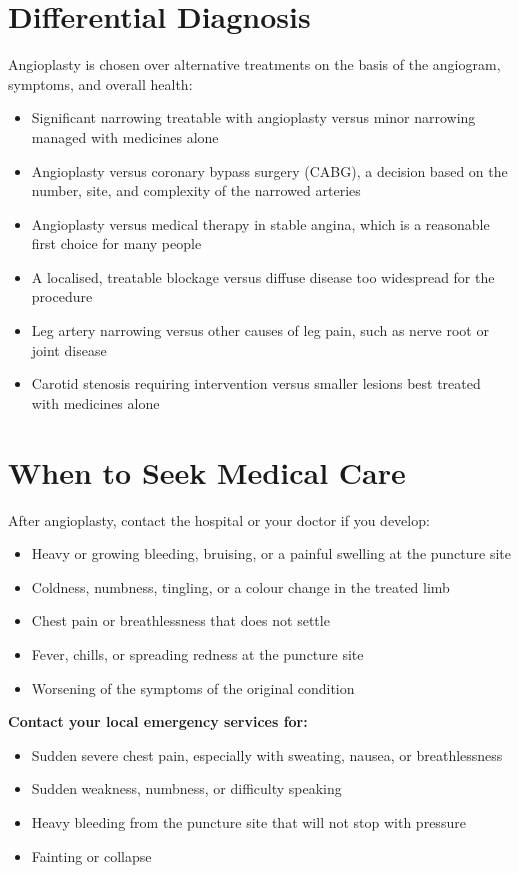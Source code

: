 \section*{Differential Diagnosis}
Angioplasty is chosen over alternative treatments on the basis of the angiogram, symptoms, and overall health:

\begin{itemize}
    \item Significant narrowing treatable with angioplasty versus minor narrowing managed with medicines alone
    \item Angioplasty versus coronary bypass surgery (CABG), a decision based on the number, site, and complexity of the narrowed arteries
    \item Angioplasty versus medical therapy in stable angina, which is a reasonable first choice for many people
    \item A localised, treatable blockage versus diffuse disease too widespread for the procedure
    \item Leg artery narrowing versus other causes of leg pain, such as nerve root or joint disease
    \item Carotid stenosis requiring intervention versus smaller lesions best treated with medicines alone
\end{itemize}

\section*{When to Seek Medical Care}
After angioplasty, contact the hospital or your doctor if you develop:

\begin{itemize}
    \item Heavy or growing bleeding, bruising, or a painful swelling at the puncture site
    \item Coldness, numbness, tingling, or a colour change in the treated limb
    \item Chest pain or breathlessness that does not settle
    \item Fever, chills, or spreading redness at the puncture site
    \item Worsening of the symptoms of the original condition
\end{itemize}

\textbf{Contact your local emergency services for:}
\begin{itemize}
    \item Sudden severe chest pain, especially with sweating, nausea, or breathlessness
    \item Sudden weakness, numbness, or difficulty speaking
    \item Heavy bleeding from the puncture site that will not stop with pressure
    \item Fainting or collapse
\end{itemize}

